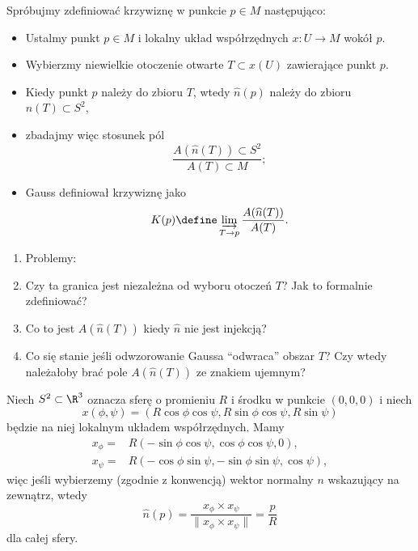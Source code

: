 \begin{frame}[<+->]
\begin{center}

\end{center}
\end{frame}
\begin{frame}[<+->]
Spróbujmy zdefiniować krzywiznę w punkcie $p\in M$ następująco:
\begin{itemize}
\item Ustalmy punkt $p\in M$ i lokalny układ współrzędnych $x\colon U\to M$ wokół $p$.
\item Wybierzmy niewielkie otoczenie otwarte $T\subset x(U)$ zawierające punkt $p$.
\item Kiedy punkt $p$ należy do zbioru $T$, wtedy $\widehat{n}(p)$ należy do zbioru $\widehat{n}(T)\subset S^2$,
\item zbadajmy więc stosunek pól \[\frac{A(\widehat{n}(T))\subset S^2}{A(T)\subset M};\]
\item Gauss definiował krzywiznę jako \[K(p)\define\varinjlim_{T\to p}\frac{A(\widehat{n}(T))}{A(T)}.\]
\end{itemize}
\end{frame}
\begin{frame}[<+->]

\begin{enumerate}
\item [] Problemy:
\item Czy ta granica jest niezależna od wyboru otoczeń $T$? Jak to formalnie zdefiniować?
\item Co to jest $A(\widehat{n}(T))$ kiedy $\widehat{n}$ nie jest injekcją?
\item Co się stanie jeśli odwzorowanie Gaussa ``odwraca'' obszar $T$? Czy wtedy należałoby brać pole $A(\widehat{n}(T))$ ze znakiem ujemnym?
\end{enumerate}

\end{frame}
\begin{frame}

\begin{przyklad}
Niech $S^2\subset \R^3$ oznacza sferę o promieniu $R$ i środku w punkcie $(0,0,0)$ i niech 
\[x(\phi,\psi)=(R \cos \phi\cos \psi , R \sin \phi \cos \psi , R \sin \psi)\] będzie na niej lokalnym układem współrzędnych. \pause Mamy 
\begin{align*}
x_\phi=&R(-\sin \phi \cos \psi,\cos \phi\cos \psi,0), \\
x_\psi=&R(-\cos\phi\sin\psi,-\sin\phi\sin\psi,\cos\psi),
\end{align*}
więc jeśli wybierzemy (zgodnie z konwencją) wektor normalny $n$ wskazujący na zewnątrz, wtedy
\[\widehat{n}(p)=\frac{x_\phi\times x_\psi}{\|x_\phi\times x_\psi\|}=\frac{p}{R}\]
dla całej sfery. 
\end{przyklad}
\end{frame}
